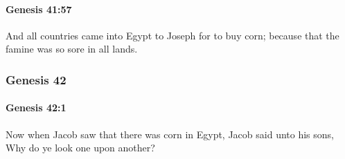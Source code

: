 		\paragraph{Genesis 41:57} %
			\label{GENESIS-41-57}

			And all countries came into Egypt to Joseph for to buy corn; because that the famine was so sore in all lands.

	\subsubsection{Genesis 42} %
		\label{GENESIS-42}

		\paragraph{Genesis 42:1} %
			\label{GENESIS-42-1}

			Now when Jacob saw that there was corn in Egypt, Jacob said unto his sons, Why do ye look one upon another?

